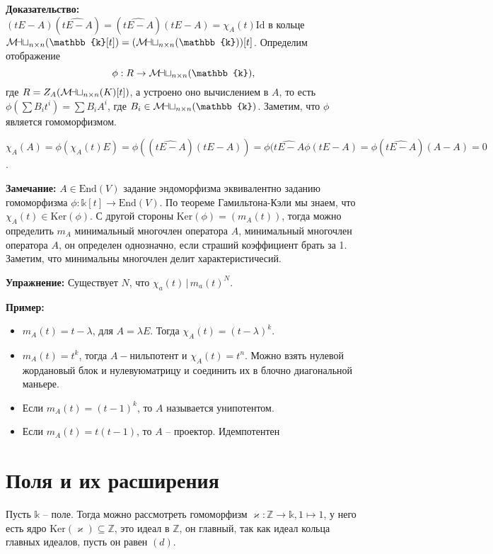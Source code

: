 \documentclass[a4paper, 12pt]{book}
\newcommand{\mymat}{\mathcal{M\mkern-3mu a\mkern-0.3mu t}}
\begin{document}
 \textbf{Доказательство:}\\$(tE-A)(\widehat{tE-A})=(\widehat{tE-A})(tE-A)=\chi_A(t)
 \text{Id}$ в кольце $\mymat_{n\times n}(\mathbb{k}[t])=(\mymat_{n\times n}
 (\mathbb{k}))[t]$. Определим отображение \[\phi: R\rightarrow\mymat_{n\times n}
 (\mathbb{k}),\] где $R=Z_A(\mymat_{n\times n}(K)[t])$, а устроено оно
 вычислением в $A$, то есть $\phi(\sum B_it^i)=\sum B_iA^i$, где $B_i\in
 \mymat_{n\times n}(\mathbb{k})$. Заметим, что $\phi$ является гомоморфизмом.

 $\chi_A(A)=\phi(\chi_A(t)E)=\phi((\widehat{tE-A})(tE-A))=\phi(\widehat{tE-A}
 \phi(tE-A)=\phi(\widehat{tE-A})(A-A)=0$.

 \textbf{Замечание:} $A\in\text{End}(V)$ задание эндоморфизма эквивалентно заданию
 гомоморфизма $\phi:\mathbb{k}[t]\rightarrow\text{End}(V)$. По теореме
 Гамильтона-Кэли мы знаем, что $\chi_A(t)\in\text{Ker}(\phi)$. С другой стороны
 $\text{Ker}(\phi)=(m_A(t))$, тогда можно определить $m_A$ минимальный многочлен
 оператора $A$, минимальный многочлен оператора $A$, он определен однозначно,
 если страший коэффициент брать за 1. Заметим, что минимальны многочлен делит
 характеристичесий.

 \textbf{Упражнение:} Существует $N$, что $\chi_a(t)\,|\,m_a(t)^N$.

 \textbf{Пример:}
 \begin{itemize}
     \item $m_A(t)=t-\lambda$, для $A=\lambda E$. Тогда $\chi_A(t)=(t-
         \lambda)^k$.

     \item $m_A(t)=t^k$, тогда $A-нильпотент$ и $\chi_A(t)=t^n$. Можно взять
         нулевой жордановый блок и нулевуюматрицу и соединить их в блочно
         диагональной маньере.

     \item Если $m_A(t)=(t-1)^k$, то $A$ называется унипотентом.
         
     \item Если $m_A(t)=t(t-1)$, то $A$ – проектор. Идемпотентен
 \end{itemize}
 \chapter{Поля и их расширения}
 Пусть $\mathbb{k}$ – поле. Тогда можно рассмотреть гомоморфизм $\varkappa:
 \mathbb{Z}\rightarrow\mathbb{k}, 1\mapsto 1$, у него есть ядро $\text{Ker}
 (\varkappa)\subseteq\mathbb{Z}$, это идеал в $\mathbb{Z}$, он главный, так как
 идеал кольца главных идеалов, пусть он равен $(d)$.
 
\end{document}
